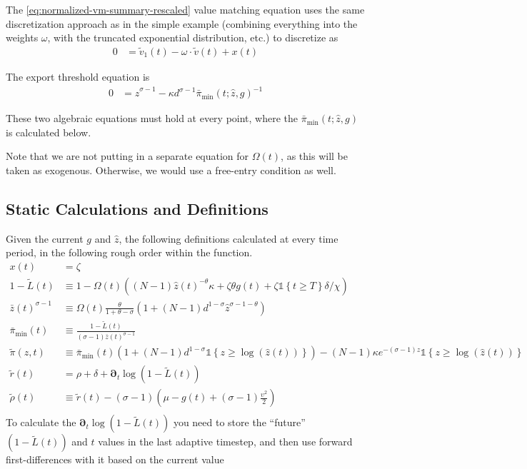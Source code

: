 \documentclass[11pt]{article}
\newcommand{\D}[1][]{\ensuremath{\boldsymbol{\partial}_{#1}}}
\newcommand{\indicator}[1]{\ensuremath{\mathds{1}\left\{{#1}\right\}}}
\begin{document}
The \cref{eq:normalized-vm-summary-rescaled} value matching equation uses the same discretization approach as in the simple example (combining everything into the weights $\omega$, with the truncated exponential distribution, etc.) to discretize as
\begin{align}
	0 &= \tilde{v}_1(t) - \omega \cdot \tilde{v}(t) + x(t)
\end{align}

The export threshold equation is
\begin{align}
	0&=\hat{z}^{\sigma-1}-  \kappa d^{\sigma - 1} \bar{\pi}_{\min}(t;\hat{z},g)^{-1}\label{eq:z-hat-power}
\end{align}

These two algebraic equations must hold at every point, where the $\bar{\pi}_{\min}(t;\hat{z},g)$ is calculated below.

Note that we are not putting in a separate equation for $\Omega(t)$, as this will be taken as exogenous.  Otherwise, we would use a free-entry condition as well.

\subsection{Static Calculations and Definitions}
Given the current $g$ and $\hat{z}$, the following definitions calculated at every time period, in the following rough order within the function.
\begin{align}
	x(t) &= \zeta\\
	1 - \tilde{L}(t) &\equiv 1 - \Omega(t)\left((N -1)\hat{z}(t)^{-\theta}\kappa + \zeta \theta g(t) + \zeta \indicator{t \geq T}\delta/\chi\right)\\
	\bar{z}(t)^{\sigma - 1}&\equiv \Omega(t)
\frac{\theta}{1+\theta - \sigma}\left(1 + (N-1)d^{1-\sigma}\hat{z}^{\sigma - 1 -\theta} \right)\label{eq:z-bar-sub-power}\\
	\bar{\pi}_{\min}(t) &\equiv \frac{1-\tilde{L}(t)}{(\sigma-1)\bar{z}(t)^{\sigma-1}}\label{eq:pi-min-def}\\
	\tilde{\pi}(z,t) &\equiv \bar{\pi}_{\min}(t)\left(1 + (N-1)d^{1-\sigma}\indicator{z \geq \log(\hat{z}(t))}\right) - (N-1)\kappa e^{-(\sigma - 1)z}\indicator{z \geq \log(\hat{z}(t))}\\
	\tilde{r}(t) &=  \rho+ \delta + \D[t]\log\left(1 - \tilde{L}(t)\right)\\	
	\tilde{\rho}(t) &\equiv \tilde{r}(t) - (\sigma - 1)\left(\mu - g(t) + (\sigma - 1)\frac{\upsilon^2}{2} \right)\label{eq:rhot}\\
\end{align}
To calculate the $\D[t]\log\left(1 - \tilde{L}(t)\right)$ you need to store the ``future'' $\left(1 - \tilde{L}(t)\right)$ and $t$ values in the last adaptive timestep, and then use forward first-differences with it based on the current value
\end{document}
